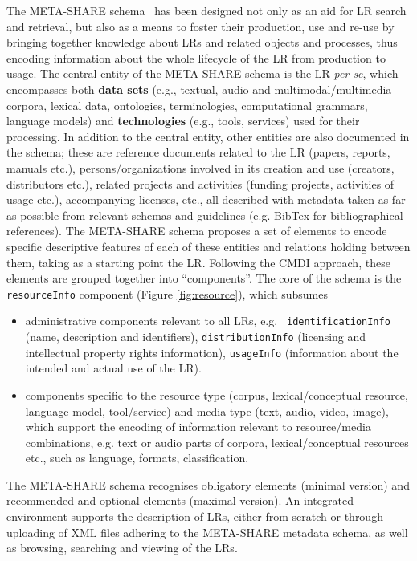 \documentclass{llncs}
\begin{document}
The META-SHARE schema~\cite{gavrilidou2012metashare} has been designed not only as an aid for LR search and retrieval, but also as a means to foster their production, use and re-use by bringing together knowledge about LRs and related objects and processes, thus encoding information about the whole lifecycle of the LR from production to usage.
The central entity of the META-SHARE schema is the LR \textit{per se}, which
encompasses both {\bf data sets} (e.g., textual, audio and multimodal/multimedia
corpora, lexical data, ontologies, terminologies, computational grammars,
language models) and {\bf technologies} (e.g., tools, services) used for their processing. 
In addition to the central entity, other entities are also documented in the schema; these are reference documents related to the LR (papers, reports,
manuals etc.), persons/organizations involved in its creation and use (creators, distributors etc.), related projects and activities (funding projects,
activities of usage etc.), accompanying licenses, etc., all described with metadata taken as far as possible from relevant schemas and guidelines (e.g. BibTex for bibliographical references). 
The META-SHARE schema proposes a set of elements to encode specific descriptive
features of each of these entities and relations holding between them, taking as
a starting point the LR. Following the CMDI approach, these elements are grouped
together into ``components''. The core of the schema is the {\tt resourceInfo}
component (Figure \ref{fig:resource}), which subsumes 
\begin{itemize}
\item administrative components relevant to all LRs, e.g. {\tt
    identificationInfo} (name, description and identifiers), {\tt distributionInfo} (licensing and intellectual property rights information), {\tt usageInfo} (information about the intended and actual use of the LR).
\item components specific to the resource type (corpus, lexical/conceptual
    resource, language model, tool/service) and media type (text, audio, video,
    image), which support the encoding of information relevant to resource/media combinations, e.g. text or audio parts of corpora, lexical/conceptual resources etc., such as language, formats, classification.
\end{itemize} 
The META-SHARE schema recognises obligatory elements (minimal version) and recommended and optional elements (maximal version). 
An integrated environment supports the description of LRs, either from scratch or through uploading of XML files adhering to the META-SHARE metadata schema, as well as browsing, searching and viewing of the LRs.
\end{document}
